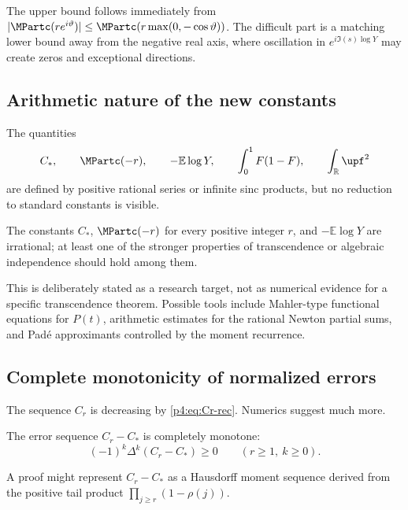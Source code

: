 \documentclass[11pt,oneside]{article}
\theoremstyle{definition}
\theoremstyle{remark}
\newcommand{\F}{F}
\newcommand{\E}{\mathbb E}
\newcommand{\R}{\mathbb R}
\newcommand{\1}{\mathbf 1}
\begin{document}
The upper bound follows immediately from
\(|\MPartc(re^{i\vartheta})|\le\MPartc(r\max(0,-\cos\vartheta))\).  The difficult part is a
matching lower bound away from the negative real axis, where oscillation in
\(e^{i\Im(s)\log Y}\) may create zeros and exceptional directions.

\subsection{Arithmetic nature of the new constants}

The quantities
\begin{equation}\label{p4:eq:new-constants}
 C_*,\qquad \MPartc(-r),\qquad -\E\log Y,
 \qquad \int_0^1\F(1-\F),\qquad \int_\R\upf^2
\end{equation}
are defined by positive rational series or infinite sinc products, but no reduction to
standard constants is visible.

\begin{conjecture}\label{p4:conj:irrationality}
The constants \(C_*\), \(\MPartc(-r)\) for every positive integer \(r\), and
\(-\E\log Y\) are irrational; at least one of the stronger properties of
transcendence or algebraic independence should hold among them.
\end{conjecture}

This is deliberately stated as a research target, not as numerical evidence for a
specific transcendence theorem.  Possible tools include Mahler-type functional
equations for \(P(t)\), arithmetic estimates for the rational Newton partial sums, and
Pad\'e approximants controlled by the moment recurrence.

\subsection{Complete monotonicity of normalized errors}

The sequence \(C_r\) is decreasing by \cref{p4:eq:Cr-rec}.  Numerics suggest much more.

\begin{conjecture}\label{p4:conj:complete-monotone}
The error sequence \(C_r-C_*\) is completely monotone:
\begin{equation}\label{p4:eq:complete-monotone-conj}
 (-1)^k\Delta^k(C_r-C_*)\ge0
 \qquad(r\ge1,\ k\ge0).
\end{equation}
\end{conjecture}

A proof might represent \(C_r-C_*\) as a Hausdorff moment sequence derived from the
positive tail product \(\prod_{j\ge r}(1-\rho(j))\).
\end{document}
